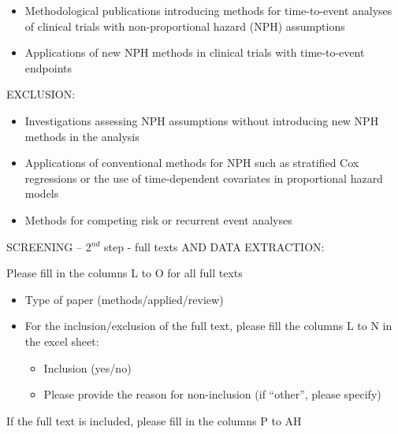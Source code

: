 \begin{itemize}
\item  Methodological publications introducing methods for time-to-event analyses of clinical trials with non-proportional hazard (NPH) assumptions 

\item  Applications of new NPH methods in clinical trials with time-to-event endpoints
\end{itemize}

\noindent EXCLUSION:

\begin{itemize}
 
\item  Investigations assessing NPH assumptions without introducing new NPH methods in the analysis 

\item  Applications of conventional methods for NPH such as stratified Cox regressions or the use of time-dependent covariates in proportional hazard models

\item  Methods for competing risk or recurrent event analyses
\end{itemize}

\noindent 

\noindent SCREENING -- 2${}^{nd}$ step - full texts AND DATA EXTRACTION:

\noindent 

\noindent Please fill in the columns L to O for all full texts 

\begin{itemize}
\item  Type of paper (methods/applied/review)

\item  For the inclusion/exclusion of the full text, please fill the columns L to N in the excel sheet:

\begin{itemize}

\item  Inclusion (yes/no)

\item  Please provide the reason for non-inclusion (if ``other'', please specify)
\end{itemize}
\end{itemize}

\noindent 

\noindent If the full text is included, please fill in the columns P to AH

